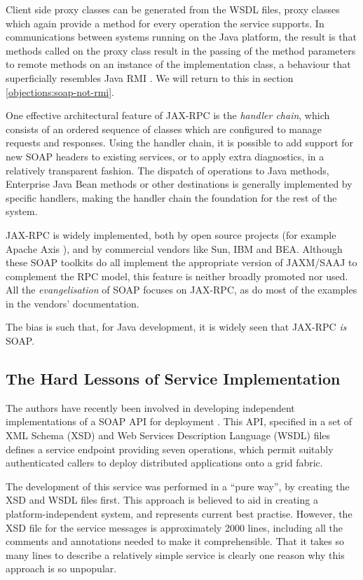 Client side proxy classes can be generated from the WSDL files, proxy
classes which again provide a method for every operation the service
supports. In communications between systems running on the Java
platform, the result is that methods called on the proxy class result
in the passing of the method parameters to remote methods on an
instance of the implementation class, a behaviour that superficially
resembles Java RMI \cite{paper:RMI}. We will return to this in section
\ref{objections:soap-not-rmi}.

One effective architectural feature of JAX-RPC is the \emph{handler chain},
which consists of an ordered sequence of classes which are configured
to manage requests and responses. Using the handler chain, it is
possible to add support for new SOAP headers to existing services, or
to apply extra diagnostics, in a relatively transparent fashion. The
dispatch of operations to Java methods, Enterprise Java Bean methods
or other destinations is generally implemented by specific handlers,
making the handler chain the foundation for the rest of the system.

JAX-RPC is widely implemented, both by open source projects (for
example Apache Axis \cite{apache:axis}), and by commercial vendors
like Sun, IBM and BEA. Although these SOAP toolkits do all implement
the appropriate version of JAXM/SAAJ to complement the RPC model, this
feature is neither broadly promoted nor used. All the
\emph{evangelisation} of SOAP focuses on JAX-RPC, as do most of the
examples in the vendors' documentation.

The bias is such that, for Java development, it is widely seen that
JAX-RPC \emph{is} SOAP.

\subsection{The Hard Lessons of Service Implementation}
\label{intro:experience}

The authors have recently been involved in developing independent
implementations of a SOAP API for deployment \cite{draft:CDDLM}. This
API, specified in a set of XML Schema (XSD) \cite{spec:XSD} and Web
Services Description Language (WSDL) files \cite{spec:WSDL-11} defines
a service endpoint providing seven operations, which permit suitably
authenticated callers to deploy distributed applications onto a grid
fabric.

The development of this service was performed in a ``pure way'', by
creating the XSD and WSDL files first. This approach is believed to
aid in creating a platform-independent system, and represents current
best practise. However, the XSD file for the service messages is
approximately 2000 lines, including all the comments and annotations
needed to make it comprehensible. That it takes so many lines to
describe a relatively simple service is clearly one reason why this
approach is so unpopular.

